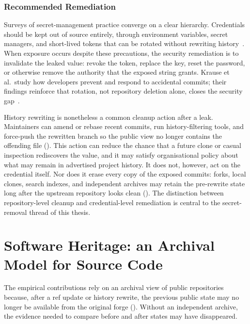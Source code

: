 \subsubsection{Recommended Remediation}
\label{subsec:bg-secrets-remediation}

Surveys of secret-management practice converge on a clear hierarchy.
Credentials should be kept out of source entirely, through environment variables, secret managers, and short-lived tokens that can be rotated without rewriting history~\cite{DBLP:conf/secdev/BasakNRW22,DBLP:journals/corr/abs-2211-06213}.
When exposure occurs despite these precautions, the security remediation is to invalidate the leaked value: revoke the token, replace the key, reset the password, or otherwise remove the authority that the exposed string grants.
Krause et al.\ study how developers prevent and respond to accidental commits; their findings reinforce that rotation, not repository deletion alone, closes the security gap~\cite{DBLP:journals/corr/abs-2211-06213}.

History rewriting is nonetheless a common cleanup action after a leak.
Maintainers can amend or rebase recent commits, run history-filtering tools, and force-push the rewritten branch so the public view no longer contains the offending file ().
This action can reduce the chance that a future clone or casual inspection rediscovers the value, and it may satisfy organisational policy about what may remain in advertised project history.
It does not, however, act on the credential itself.
Nor does it erase every copy of the exposed commits: forks, local clones, search indexes, and independent archives may retain the pre-rewrite state long after the upstream repository looks clean ().
The distinction between repository-level cleanup and credential-level remediation is central to the secret-removal thread of this thesis.

\section{Software Heritage: an Archival Model for Source Code}
\label{sec:bg-software-heritage}

The empirical contributions rely on an archival view of public repositories because, after a ref update or history rewrite, the previous public state may no longer be available from the original forge ().
Without an independent archive, the evidence needed to compare before and after states may have disappeared.

